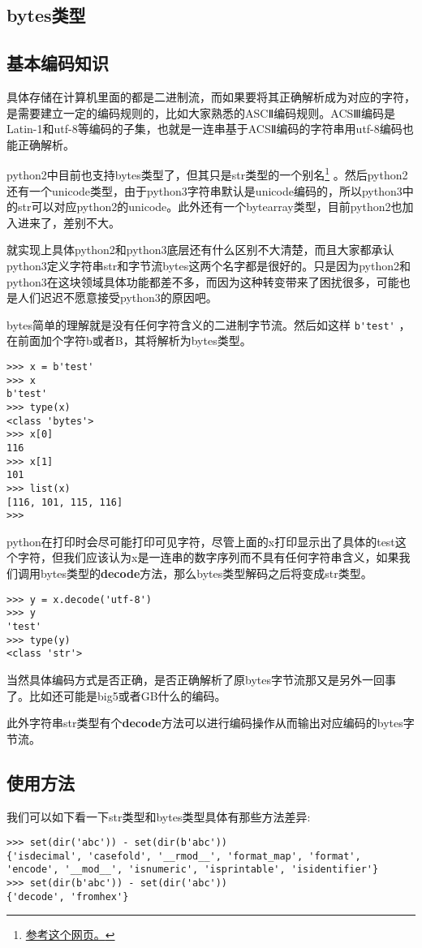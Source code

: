 \documentclass[12pt,oneside]{book}
\begin{document}
\begin{common-format}
\section{bytes类型}
\subsection{基本编码知识}
具体存储在计算机里面的都是二进制流，而如果要将其正确解析成为对应的字符，是需要建立一定的编码规则的，比如大家熟悉的ASCⅡ编码规则。ACSⅢ编码是Latin-1和utf-8等编码的子集，也就是一连串基于ACSⅡ编码的字符串用utf-8编码也能正确解析。

python2中目前也支持bytes类型了，但其只是str类型的一个别名\footnote{\href{http://stackoverflow.com/questions/5901706/the-bytes-type-in-python-2-7-and-pep-358}{参考这个网页。}} 。然后python2还有一个unicode类型，由于python3字符串默认是unicode编码的，所以python3中的str可以对应python2的unicode。此外还有一个bytearray类型，目前python2也加入进来了，差别不大。

就实现上具体python2和python3底层还有什么区别不大清楚，而且大家都承认python3定义字符串str和字节流bytes这两个名字都是很好的。只是因为python2和python3在这块领域具体功能都差不多，而因为这种转变带来了困扰很多，可能也是人们迟迟不愿意接受python3的原因吧。


bytes简单的理解就是没有任何字符含义的二进制字节流。然后如这样 \verb+b'test'+ ，在前面加个字符b或者B，其将解析为bytes类型。

\begin{Verbatim}
>>> x = b'test'
>>> x
b'test'
>>> type(x)
<class 'bytes'>
>>> x[0]
116
>>> x[1]
101
>>> list(x)
[116, 101, 115, 116]
>>> 
\end{Verbatim}

python在打印时会尽可能打印可见字符，尽管上面的x打印显示出了具体的test这个字符，但我们应该认为x是一连串的数字序列而不具有任何字符串含义，如果我们调用bytes类型的\textbf{decode}方法，那么bytes类型解码之后将变成str类型。

\begin{Verbatim}
>>> y = x.decode('utf-8')
>>> y
'test'
>>> type(y)
<class 'str'>
\end{Verbatim}

当然具体编码方式是否正确，是否正确解析了原bytes字节流那又是另外一回事了。比如还可能是big5或者GB什么的编码。

此外字符串str类型有个\textbf{decode}方法可以进行编码操作从而输出对应编码的bytes字节流。

\subsection{使用方法}
我们可以如下看一下str类型和bytes类型具体有那些方法差异:
\begin{Verbatim}
>>> set(dir('abc')) - set(dir(b'abc'))
{'isdecimal', 'casefold', '__rmod__', 'format_map', 'format', 'encode', '__mod__', 'isnumeric', 'isprintable', 'isidentifier'}
>>> set(dir(b'abc')) - set(dir('abc'))
{'decode', 'fromhex'}
\end{Verbatim}


\end{common-format}
\end{document}

